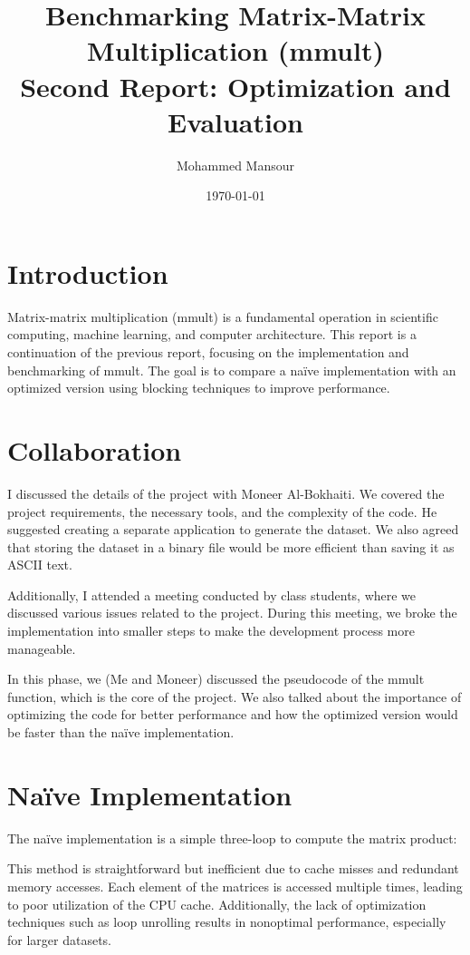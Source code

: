 \documentclass[12pt]{article}
\title{Benchmarking Matrix-Matrix Multiplication (mmult) \\ \large{Second Report: Optimization and Evaluation}}
\author{Mohammed Mansour}
\date{\today}
\begin{document}
\maketitle

\section{Introduction}
Matrix-matrix multiplication (mmult) is a fundamental operation in scientific computing, machine learning, and computer architecture. This report is a continuation of the previous report, focusing on the implementation and benchmarking of mmult. The goal is to compare a naïve implementation with an optimized version using blocking techniques to improve performance.

\section{Collaboration}
I discussed the details of the project with Moneer Al-Bokhaiti. We covered the project requirements, the necessary tools, and the complexity of the code. He suggested creating a separate application to generate the dataset. We also agreed that storing the dataset in a binary file would be more efficient than saving it as ASCII text.

Additionally, I attended a meeting conducted by class students, where we discussed various issues related to the project. During this meeting, we broke the implementation into smaller steps to make the development process more manageable.

In this phase, we (Me and Moneer) discussed the pseudocode of the mmult function, which is the core of the project. We also talked about the importance of optimizing the code for better performance and how the optimized version would be faster than the naïve implementation.

\section{Naïve Implementation}
The naïve implementation is a simple three-loop to compute the matrix product:



This method is straightforward but inefficient due to cache misses and redundant memory accesses. Each element of the matrices is accessed multiple times, leading to poor utilization of the CPU cache. Additionally, the lack of optimization techniques such as loop unrolling results in nonoptimal performance, especially for larger datasets.
\end{document}
